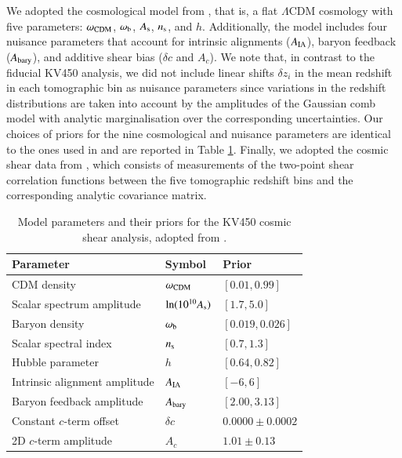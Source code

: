\documentclass{aa}
\begin{document}
We adopted the cosmological model from \cite{hildebrandt18}, that is, a flat $\Lambda$CDM cosmology with five parameters: $\omega_{\rm CDM}$, $\omega_{\rm b}$, $A_{\rm s}$, $n_{\rm s}$, and $h$. Additionally, the model includes four nuisance parameters that account for intrinsic alignments ($A_{\rm IA}$), baryon feedback ($A_{\rm bary}$), and additive shear bias ($\delta c$ and $A_c$). We note that, in contrast to the fiducial KV450 analysis, we did not include linear shifts $\delta z_i$ in the mean redshift in each tomographic bin as nuisance parameters since variations in the redshift distributions are taken into account by the amplitudes of the Gaussian comb model with analytic marginalisation over the corresponding uncertainties. Our choices of priors for the nine cosmological and nuisance parameters are identical to the ones used in \cite{hildebrandt18} and are reported in Table \ref{tab:priors}. Finally, we adopted the cosmic shear data from \cite{hildebrandt18}, which consists of measurements of the two-point shear correlation functions between the five tomographic redshift bins and the corresponding analytic covariance matrix.
\begin{table}
\caption{Model parameters and their priors for the KV450 cosmic shear analysis, adopted from \cite{hildebrandt18}.}
\centering
\begin{tabular}{lll}
\hline\hline
Parameter & Symbol & Prior\\
\hline
CDM density & $\omega_{\rm CDM}$ & $[0.01, 0.99]$\\
Scalar spectrum amplitude & $\ln(10^{10}A_{\rm s})$ & $[1.7, 5.0]$\\
Baryon density & $\omega_{\rm b}$ & $[0.019, 0.026]$ \\
Scalar spectral index & $n_{\rm s}$ & $[0.7, 1.3]$ \\
Hubble parameter & $h$ & $[0.64, 0.82]$ \\
\hline
Intrinsic alignment amplitude & $A_{\rm IA}$ & $[-6, 6]$\\
Baryon feedback amplitude & $A_{\rm bary}$ & $[2.00, 3.13]$\\
Constant $c$-term offset & $\delta c$ & $0.0000\pm0.0002$ \\
2D $c$-term amplitude & $A_c$ & $1.01\pm0.13$\\
\hline
\end{tabular}
\label{tab:priors}
\end{table}
\end{document}

